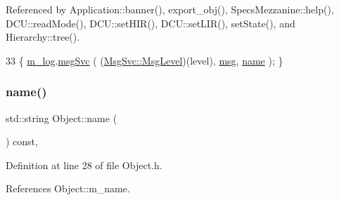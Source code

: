 Referenced by Application\+::banner(), export\+\_\+obj(), Specs\+Mezzanine\+::help(), D\+C\+U\+::read\+Mode(), D\+C\+U\+::set\+H\+I\+R(), D\+C\+U\+::set\+L\+I\+R(), set\+State(), and Hierarchy\+::tree().


\begin{DoxyCode}
33 \{ \hyperlink{classObject_a0d269813dd7ac1f24bc143031e2963f2}{m\_log}.\hyperlink{classMsgSvc_ad25f18047920cc59a314e5098259711c}{msgSvc} ( (\hyperlink{classMsgSvc_ae671eb7301996cd049d2da8a65925926}{MsgSvc::MsgLevel})(level), \hyperlink{classObject_a58b2d0618c2d08cf2383012611528d97}{msg}, 
      \hyperlink{classObject_a300f4c05dd468c7bb8b3c968868443c1}{name} ); \}
\end{DoxyCode}
\mbox{\label{classObject_a300f4c05dd468c7bb8b3c968868443c1}} 
\subsubsection{\texorpdfstring{name()}{name()}}
{\footnotesize\ttfamily std\+::string Object\+::name (\begin{DoxyParamCaption}{ }\end{DoxyParamCaption}) const\hspace{0.3cm}{\ttfamily [inline]}, {\ttfamily [inherited]}}



Definition at line 28 of file Object.\+h.



References Object\+::m\+\_\+name.



